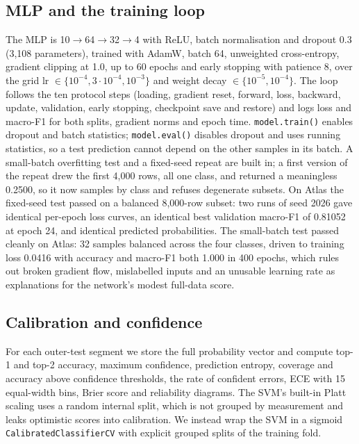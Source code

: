 \documentclass[conference]{IEEEtran}
\begin{document}
\subsection{MLP and the training loop}
The MLP is 10$\rightarrow$64$\rightarrow$32$\rightarrow$4 with ReLU, batch normalisation and dropout 0.3 (3,108 parameters), trained with AdamW, batch 64, unweighted cross-entropy, gradient clipping at 1.0, up to 60 epochs and early stopping with patience 8, over the grid lr $\in\{10^{-4},3\cdot10^{-4},10^{-3}\}$ and weight decay $\in\{10^{-5},10^{-4}\}$. The loop follows the ten protocol steps (loading, gradient reset, forward, loss, backward, update, validation, early stopping, checkpoint save and restore) and logs loss and macro-F1 for both splits, gradient norms and epoch time. \texttt{model.train()} enables dropout and batch statistics; \texttt{model.eval()} disables dropout and uses running statistics, so a test prediction cannot depend on the other samples in its batch. A small-batch overfitting test and a fixed-seed repeat are built in; a first version of the repeat drew the first 4,000 rows, all one class, and returned a meaningless 0.2500, so it now samples by class and refuses degenerate subsets. On Atlas the fixed-seed test passed on a balanced 8,000-row subset: two runs of seed 2026 gave identical per-epoch loss curves, an identical best validation macro-F1 of 0.81052 at epoch 24, and identical predicted probabilities. The small-batch test passed cleanly on Atlas: 32 samples balanced across the four classes, driven to training loss 0.0416 with accuracy and macro-F1 both 1.000 in 400 epochs, which rules out broken gradient flow, mislabelled inputs and an unusable learning rate as explanations for the network's modest full-data score.

\subsection{Calibration and confidence}
\label{sec:calib}
For each outer-test segment we store the full probability vector and compute top-1 and top-2 accuracy, maximum confidence, prediction entropy, coverage and accuracy above confidence thresholds, the rate of confident errors, ECE with 15 equal-width bins, Brier score and reliability diagrams. The SVM's built-in Platt scaling uses a random internal split, which is not grouped by measurement and leaks optimistic scores into calibration. We instead wrap the SVM in a sigmoid \texttt{CalibratedClassifierCV} with explicit grouped splits of the training fold.
\end{document}
